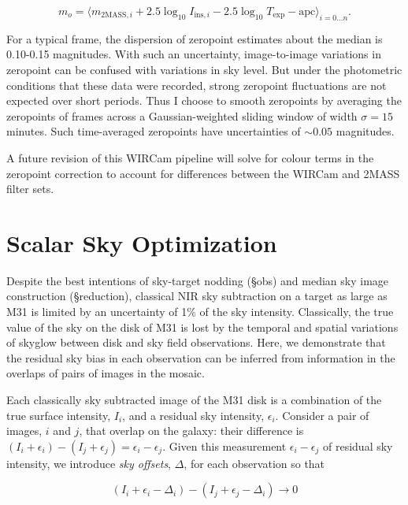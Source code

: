 \documentclass[iop]{emulateapj}
\begin{document}
\begin{equation}
    m_o = \langle m_{\text{2MASS},i} +2.5\log_{10}I_{\text{ins},i} - 2.5 \log_{10} T_\text{exp} - \text{apc} \rangle_{i=0\ldots n}.
\end{equation}

For a typical frame, the dispersion of zeropoint estimates about the median is 0.10-0.15 magnitudes. With such an uncertainty, image-to-image variations in zeropoint can be confused with variations in sky level. But under the photometric conditions that these data were recorded, strong zeropoint fluctuations are not expected over short periods. Thus I choose to smooth zeropoints by averaging the zeropoints of frames across a Gaussian-weighted sliding window of width $\sigma=15$ minutes. Such time-averaged zeropoints have uncertainties of $\sim 0.05$ magnitudes.

A future revision of this WIRCam pipeline will solve for colour terms in the zeropoint correction to account for differences between the WIRCam and 2MASS filter sets.

\section{Scalar Sky Optimization}
\label{sec:scalar}

Despite the best intentions of sky-target nodding (\S obs) and median sky image construction (\S reduction), classical NIR sky subtraction on a target as large as M31 is limited by an uncertainty of 1\% of the sky intensity. Classically, the true value of the sky on the disk of M31 is lost by the temporal and spatial variations of skyglow between disk and sky field observations. Here, we demonstrate that the residual sky bias in each observation can be inferred from information in the overlaps of pairs of images in the mosaic.

Each classically sky subtracted image of the M31 disk is a combination of the true surface intensity, $I_i$, and a residual sky intensity, $\epsilon_i$. Consider a pair of images, $i$ and $j$, that overlap on the galaxy: their difference is $(I_i+\epsilon_i) - (I_j+\epsilon_j) = \epsilon_i - \epsilon_j$. Given this measurement $\epsilon_i - \epsilon_j$ of residual sky intensity, we introduce \emph{sky offsets}, $\Delta$, for each observation so that

\begin{equation}
    (I_i + \epsilon_i - \Delta_i) - (I_j + \epsilon_j - \Delta_i) \rightarrow 0
\end{equation}
\end{document}
